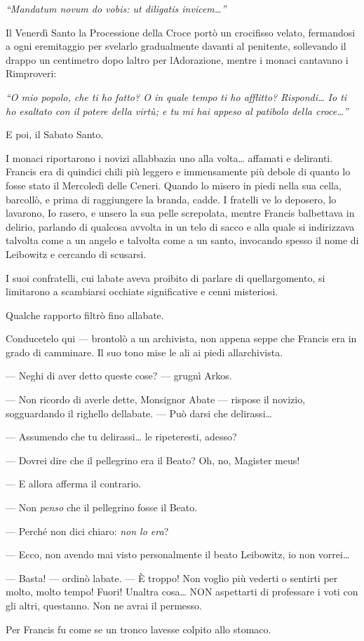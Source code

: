 \emph{``Mandatum novum do vobis: ut diligatis invicem\ldots''}

Il Venerdì Santo la Processione della Croce portò un crocifisso velato,
fermandosi a ogni eremitaggio per svelarlo gradualmente davanti al
penitente, sollevando il drappo un centimetro dopo
l\textquotesingle altro per l\textquotesingle Adorazione, mentre i
monaci cantavano i Rimproveri:

\emph{``O mio popolo, che ti ho fatto? O in quale tempo ti ho afflitto?
	Rispondi\ldots{} Io ti ho esaltato con il potere della virtù; e tu mi
	hai appeso al patibolo della croce\ldots''}

E poi, il Sabato Santo.

I monaci riportarono i novizi all\textquotesingle abbazia uno alla
volta\ldots{} affamati e deliranti. Francis era di quindici chili più
leggero e immensamente più debole di quanto lo fosse stato il Mercoledì
delle Ceneri. Quando lo misero in piedi nella sua cella, barcollò, e
prima di raggiungere la branda, cadde. I fratelli ve lo deposero, lo
lavarono, Io rasero, e unsero la sua pelle screpolata, mentre Francis
balbettava in delirio, parlando di qualcosa avvolta in un telo di sacco
e alla quale si indirizzava talvolta come a un angelo e talvolta come a
un santo, invocando spesso il nome di Leibowitz e cercando di scusarsi.

I suoi confratelli, cui l\textquotesingle abate aveva proibito di
parlare di quell\textquotesingle argomento, si limitarono a scambiarsi
occhiate significative e cenni misteriosi.

Qualche rapporto filtrò fino all\textquotesingle abate.

Conducetelo qui --- brontolò a un archivista, non appena seppe che
Francis era in grado di camminare. Il suo tono mise le ali ai piedi
all\textquotesingle archivista.

--- Neghi di aver detto queste cose? --- grugnì Arkos.

--- Non ricordo di averle dette, Monsignor Abate --- rispose il novizio,
sogguardando il righello dell\textquotesingle abate. --- Può darsi che
delirassi\ldots{}

--- Assumendo che tu delirassi\ldots{} le ripeteresti, adesso?

--- Dovrei dire che il pellegrino era il Beato? Oh, no, Magister meus!

--- E allora afferma il contrario.

--- Non \emph{penso} che il pellegrino fosse il Beato.

--- Perché non dici chiaro: \emph{non lo era}?

--- Ecco, non avendo mai visto personalmente il beato Leibowitz, io non
vorrei\ldots{}

--- Basta! --- ordinò l\textquotesingle abate. --- È troppo! Non voglio
più vederti o sentirti per molto, molto tempo! Fuori!
Un\textquotesingle altra cosa\ldots{} NON aspettarti di professare i
voti con gli altri, quest\textquotesingle anno. Non ne avrai il
permesso.

Per Francis fu come se un tronco l\textquotesingle avesse colpito allo
stomaco.
